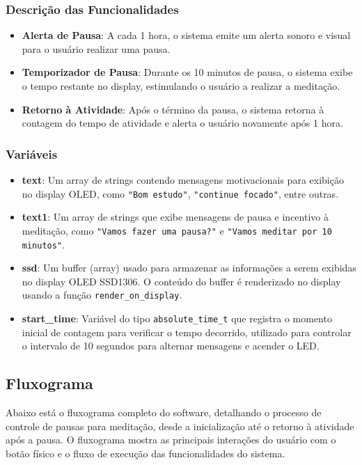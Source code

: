 \documentclass{article}
\begin{document}
\subsubsection{Descrição das Funcionalidades}
\begin{itemize}
  \item \textbf{Alerta de Pausa}: A cada 1 hora, o sistema emite um alerta sonoro e visual para o usuário realizar uma pausa.
  \item \textbf{Temporizador de Pausa}: Durante os 10 minutos de pausa, o sistema exibe o tempo restante no display, estimulando o usuário a realizar a meditação.
  \item \textbf{Retorno à Atividade}: Após o término da pausa, o sistema retorna à contagem do tempo de atividade e alerta o usuário novamente após 1 hora.
\end{itemize}

\subsubsection{Variáveis}

\begin{itemize}
    \item \textbf{text}: Um array de strings contendo mensagens motivacionais para exibição no display OLED, como \texttt{"Bom estudo"}, \texttt{"continue focado"}, entre outras.

    \item \textbf{text1}: Um array de strings que exibe mensagens de pausa e incentivo à meditação, como \texttt{"Vamos fazer uma pausa?"} e \texttt{"Vamos meditar por 10 minutos"}.

    \item \textbf{ssd}: Um buffer (array) usado para armazenar as informações a serem exibidas no display OLED SSD1306. O conteúdo do buffer é renderizado no display usando a função \texttt{render\_on\_display}.

    \item \textbf{start\_time}: Variável do tipo \texttt{absolute\_time\_t} que registra o momento inicial de contagem para verificar o tempo decorrido, utilizado para controlar o intervalo de 10 segundos para alternar mensagens e acender o LED.
\end{itemize}


\subsection{Fluxograma}
Abaixo está o fluxograma completo do software, detalhando o processo de controle de pausas para meditação, desde a inicialização até o retorno à atividade após a pausa. O fluxograma mostra as principais interações do usuário com o botão físico e o fluxo de execução das funcionalidades do sistema.
\end{document}
